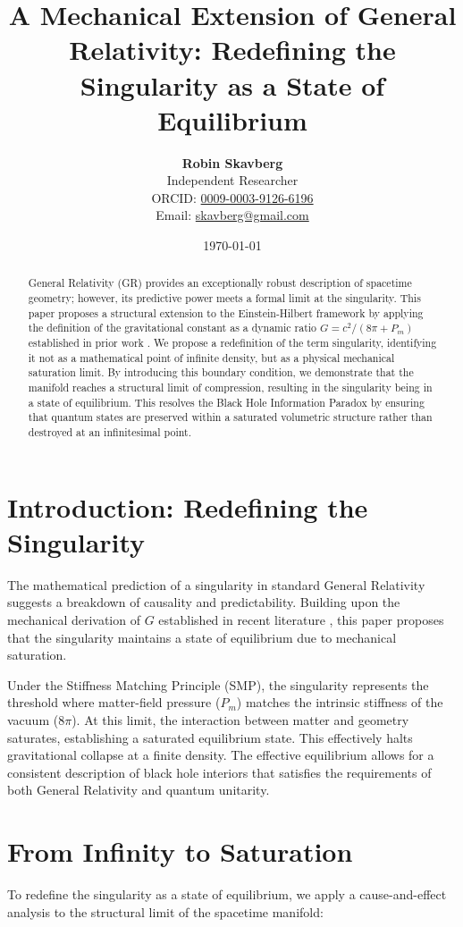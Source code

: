\documentclass[11pt,letterpaper]{article}
\title{\textbf{A Mechanical Extension of General Relativity: Redefining the Singularity as a State of Equilibrium}}
\author{
    \textbf{Robin Skavberg} \\
    \small Independent Researcher \\
    \small ORCID: \href{https://orcid.org/0009-0003-9126-6196}{0009-0003-9126-6196} \\
    \small Email: \href{mailto:skavberg@gmail.com}{skavberg@gmail.com}
}
\date{\today}
\begin{document}
\maketitle

\begin{abstract}
General Relativity (GR) provides an exceptionally robust description of spacetime geometry; however, its predictive power meets a formal limit at the singularity. This paper proposes a structural extension to the Einstein-Hilbert framework by applying the definition of the gravitational constant as a dynamic ratio $G = c^2 / (8\pi + P_m)$ established in prior work \cite{Skavberg2026}. We propose a redefinition of the term singularity, identifying it not as a mathematical point of infinite density, but as a physical mechanical saturation limit. By introducing this boundary condition, we demonstrate that the manifold reaches a structural limit of compression, resulting in the singularity being in a state of equilibrium. This resolves the Black Hole Information Paradox by ensuring that quantum states are preserved within a saturated volumetric structure rather than destroyed at an infinitesimal point.
\end{abstract}

\section{Introduction: Redefining the Singularity}
The mathematical prediction of a singularity in standard General Relativity suggests a breakdown of causality and predictability. Building upon the mechanical derivation of $G$ established in recent literature \cite{Skavberg2026}, this paper proposes that the singularity maintains a state of equilibrium due to mechanical saturation. 

Under the Stiffness Matching Principle (SMP), the singularity represents the threshold where matter-field pressure ($P_m$) matches the intrinsic stiffness of the vacuum ($8\pi$). At this limit, the interaction between matter and geometry saturates, establishing a saturated equilibrium state. This effectively halts gravitational collapse at a finite density. The effective equilibrium allows for a consistent description of black hole interiors that satisfies the requirements of both General Relativity and quantum unitarity.

\section{From Infinity to Saturation}
To redefine the singularity as a state of equilibrium, we apply a cause-and-effect analysis to the structural limit of the spacetime manifold:
\end{document}
